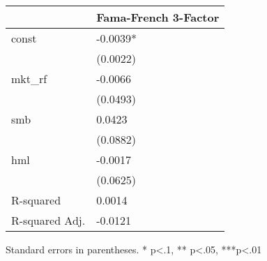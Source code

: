 \begin{table}
\caption{}
\label{}
\begin{center}
\begin{tabular}{ll}
\hline
               & Fama-French 3-Factor  \\
\hline
const          & -0.0039*              \\
               & (0.0022)              \\
mkt\_rf        & -0.0066               \\
               & (0.0493)              \\
smb            & 0.0423                \\
               & (0.0882)              \\
hml            & -0.0017               \\
               & (0.0625)              \\
R-squared      & 0.0014                \\
R-squared Adj. & -0.0121               \\
\hline
\end{tabular}
\end{center}
\end{table}
\bigskip
Standard errors in parentheses. \newline 
* p<.1, ** p<.05, ***p<.01